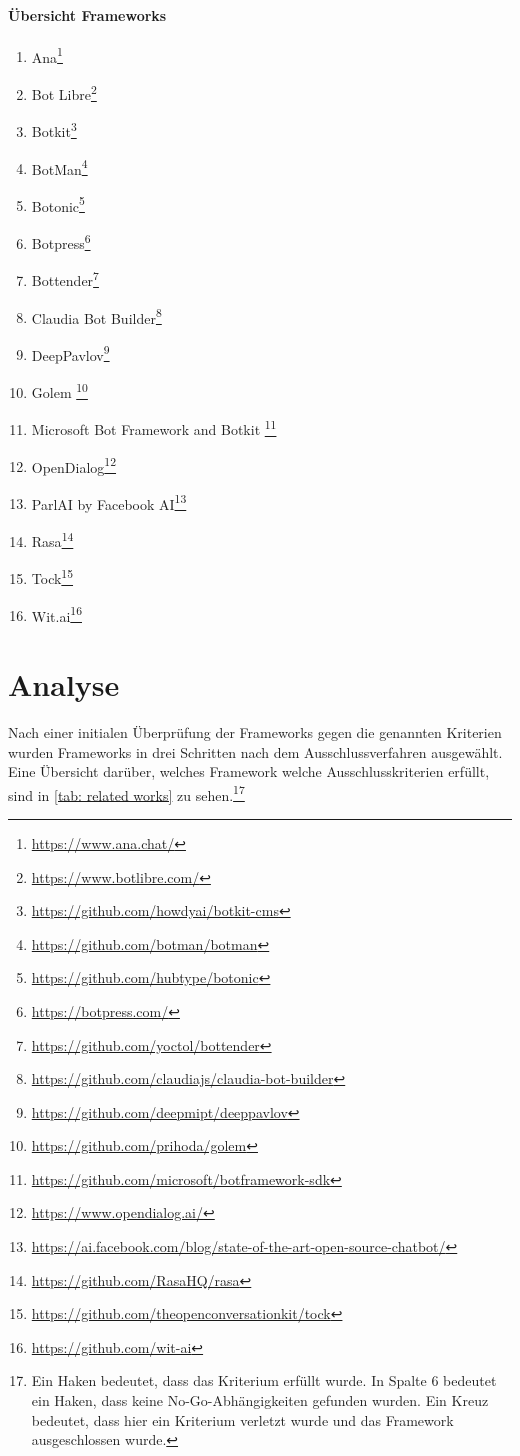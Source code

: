     \paragraph{Übersicht Frameworks}
    \begin{enumerate}
        \item Ana\footnote{\url{https://www.ana.chat/}}
        \item Bot Libre\footnote{\url{https://www.botlibre.com/}}
        \item Botkit\footnote{\url{https://github.com/howdyai/botkit-cms}}
        \item BotMan\footnote{\url{https://github.com/botman/botman}}
        \item Botonic\footnote{\url{https://github.com/hubtype/botonic}}
        \item Botpress\footnote{\url{https://botpress.com/}}
        \item Bottender\footnote{\url{https://github.com/yoctol/bottender}}
        \item Claudia Bot Builder\footnote{\url{https://github.com/claudiajs/claudia-bot-builder}}
        \item DeepPavlov\footnote{\url{https://github.com/deepmipt/deeppavlov}}
        \item Golem \footnote{\url{https://github.com/prihoda/golem}}
        \item Microsoft Bot Framework and Botkit \footnote{\url{https://github.com/microsoft/botframework-sdk}}
        \item OpenDialog\footnote{\url{https://www.opendialog.ai/}}
        \item ParlAI by Facebook AI\footnote{\url{https://ai.facebook.com/blog/state-of-the-art-open-source-chatbot/}}
        \item Rasa\footnote{\url{https://github.com/RasaHQ/rasa}}
        \item Tock\footnote{\url{https://github.com/theopenconversationkit/tock}}
        \item Wit.ai\footnote{\url{https://github.com/wit-ai}}
    \end{enumerate}

    \section{Analyse} \label{VerwandteArbeiten: Analyse}
        Nach einer initialen Überprüfung der Frameworks gegen die genannten Kriterien wurden Frameworks in drei Schritten nach dem Ausschlussverfahren ausgewählt. Eine Übersicht darüber, welches Framework welche Ausschlusskriterien erfüllt, sind in \ref*{tab: related works} zu sehen.\footnote{Ein Haken bedeutet, dass das Kriterium erfüllt wurde. In Spalte 6 bedeutet ein Haken, dass keine No-Go-Abhängigkeiten gefunden wurden. Ein Kreuz bedeutet, dass hier ein Kriterium verletzt wurde und das Framework ausgeschlossen wurde.}
    
